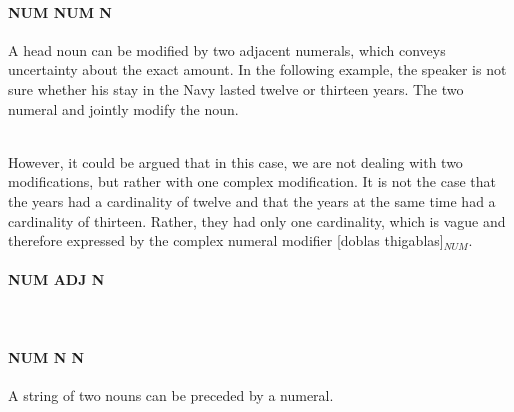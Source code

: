 \paragraph{NUM   NUM N}

A head noun can be modified by two adjacent numerals, which conveys uncertainty about the exact amount.
In the following example, the speaker is not sure whether his stay in the Navy lasted twelve or thirteen years. The two numeral  and  jointly modify the noun.

\\

However, it could be argued that in this case, we are not dealing with two modifications, but rather with one complex modification. It is not the case that the years had a cardinality of twelve and that the years at the same time had a cardinality of thirteen. Rather, they had only one cardinality, which is vague and therefore expressed by the complex numeral modifier [doblas thigablas]$_{NUM}$.

\paragraph{NUM ADJ N}

\\

\paragraph{NUM N N}
A string of two nouns can be preceded by a numeral.

\\
%

